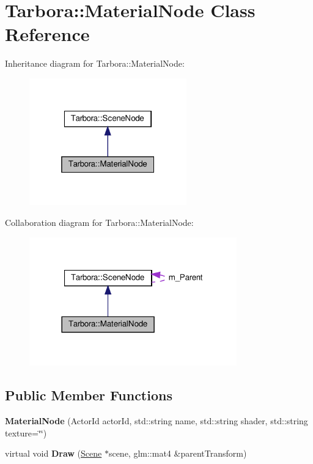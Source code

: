 \hypertarget{classTarbora_1_1MaterialNode}{}\section{Tarbora\+:\+:Material\+Node Class Reference}
\label{classTarbora_1_1MaterialNode}


Inheritance diagram for Tarbora\+:\+:Material\+Node\+:\nopagebreak
\begin{figure}[H]
\begin{center}
\leavevmode
\includegraphics[width=193pt]{classTarbora_1_1MaterialNode__inherit__graph}
\end{center}
\end{figure}


Collaboration diagram for Tarbora\+:\+:Material\+Node\+:\nopagebreak
\begin{figure}[H]
\begin{center}
\leavevmode
\includegraphics[width=254pt]{classTarbora_1_1MaterialNode__coll__graph}
\end{center}
\end{figure}
\subsection*{Public Member Functions}
\begin{DoxyCompactItemize}
\item 
\mbox{\label{classTarbora_1_1MaterialNode_afd0e3139cbb0826d6036dd6d67b59b99}} 
{\bfseries Material\+Node} (Actor\+Id actor\+Id, std\+::string name, std\+::string shader, std\+::string texture=\char`\"{}\char`\"{})
\item 
\mbox{\label{classTarbora_1_1MaterialNode_ab8f6e0d14b183da53bd08af20dc45193}} 
virtual void {\bfseries Draw} (\hyperlink{classTarbora_1_1Scene}{Scene} $\ast$scene, glm\+::mat4 \&parent\+Transform)
\end{DoxyCompactItemize}
